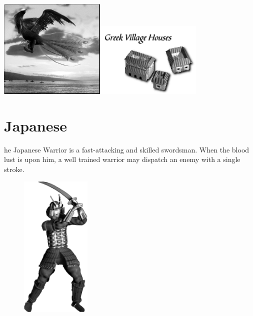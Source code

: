 \begin{center}
	\includegraphics[width=2in]{Aphoenix}\hspace{1pt}\includegraphics[width=2in]{Igreekhouse}
\end{center}

\clearpage

\section{Japanese}


he Japanese Warrior is a fast-attacking and skilled swordsman. When the blood lust is upon him, a well trained warrior may dispatch an enemy with a single stroke.

\begin{figure}
	\begin{center}
		\vspace{-20pt}
		\includegraphics[width=0.3\textwidth]{Ajapanese}
	\end{center}
	\vspace{-40pt}
\end{figure}

